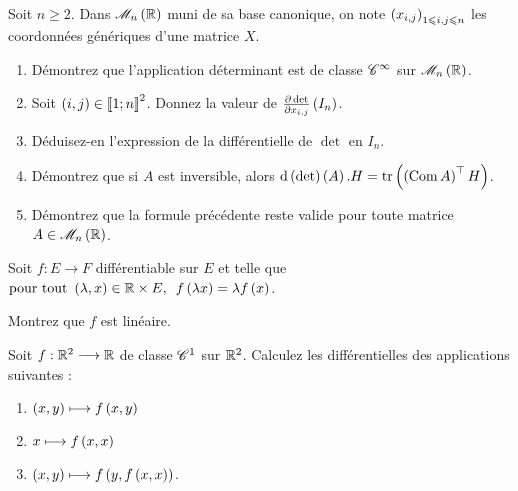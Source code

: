 \begin{exoss}
Soit \(n\geq2\). Dans \(\M{n}[\R]\) muni de sa base canonique, on note \(\left(x_{i,j}\right)_{1\leqslant i,j\leqslant n}\) les coordonnées génériques d'une matrice \(X\).

\begin{enumerate}
    \item Démontrez que l'application déterminant est de classe \(\mathscr{C}^{\infty}\) sur \(\M{n}[\R]\). \\
    \item Soit \(\left(i,j\right)\in\left\llbracket1;n\right\rrbracket^2\). Donnez la valeur de \(\pdv{\det}{x_{i,j}}\left(I_n\right)\). \\
    \item Déduisez-en l'expression de la différentielle de \(\det\) en \(I_n\). \\
    \item Démontrez que si \(A\) est inversible, alors \(\odif{\paren{\det}}\paren{A}.H=\tr\paren{\trans{\paren{\Com{A}}}H}\). \\
    \item Démontrez que la formule précédente reste valide pour toute matrice \(A\in\M{n}[\R]\).
\end{enumerate}
\end{exoss}

\begin{exoss}
Soit \(f:E\to F\) différentiable sur \(E\) et telle que \(\quantifs{\tpt\paren{\lambda,x}\in\R\times E}f\paren{\lambda x}=\lambda f\paren{x}\).

Montrez que \(f\) est linéaire.
\end{exoss}

\begin{exoss}
Soit \(f:\mathbb{R}^2\longrightarrow\mathbb{R}\) de classe \(\mathscr{C}^{1}\) sur \(\mathbb{R}^2\). Calculez les différentielles des applications suivantes :

\begin{enumerate}
    \item \(\left(x,y\right)\longmapsto f\left(x,y\right)\) \\
    \item \(x\longmapsto f\left(x,x\right)\) \\
    \item \(\left(x,y\right)\longmapsto f\left(y,f\left(x,x\right)\right)\).
\end{enumerate}
\end{exoss}

